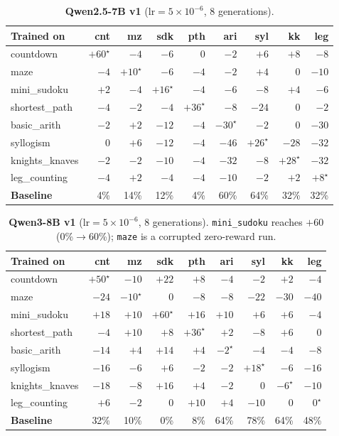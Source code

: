 \documentclass{article}
\begin{document}
\begin{table}[h]
\centering\small
\caption{\textbf{Qwen2.5-7B v1} ($\mathrm{lr}{=}5{\times}10^{-6}$, 8 generations).}
\begin{tabular}{lrrrrrrrr}
\toprule
Trained on & cnt & mz & sdk & pth & ari & syl & kk & leg\\
\midrule
countdown      & $+60^\star$ & $-4$ & $-6$ & $0$ & $-2$ & $+6$ & $+8$ & $-8$\\
maze           & $-4$ & $+10^\star$ & $-6$ & $-4$ & $-2$ & $+4$ & $0$ & $-10$\\
mini\_sudoku   & $+2$ & $-4$ & $+16^\star$ & $-4$ & $-6$ & $-8$ & $+4$ & $-6$\\
shortest\_path & $-4$ & $-2$ & $-4$ & $+36^\star$ & $-8$ & $-24$ & $0$ & $-2$\\
basic\_arith   & $-2$ & $+2$ & $-12$ & $-4$ & $-30^\star$ & $-2$ & $0$ & $-30$\\
syllogism      & $0$ & $+6$ & $-12$ & $-4$ & $-46$ & $+26^\star$ & $-28$ & $-32$\\
knights\_knaves& $-2$ & $-2$ & $-10$ & $-4$ & $-32$ & $-8$ & $+28^\star$ & $-32$\\
leg\_counting  & $-4$ & $+2$ & $-4$ & $-4$ & $-10$ & $-2$ & $+2$ & $+8^\star$\\
\midrule
\textbf{Baseline} & 4\% & 14\% & 12\% & 4\% & 60\% & 64\% & 32\% & 32\%\\
\bottomrule
\end{tabular}
\end{table}

\begin{table}[h]
\centering\small
\caption{\textbf{Qwen3-8B v1} ($\mathrm{lr}{=}5{\times}10^{-6}$, 8 generations). \texttt{mini\_sudoku}
reaches $+60$ (0\%$\rightarrow$60\%); \texttt{maze} is a corrupted zero-reward run.}
\begin{tabular}{lrrrrrrrr}
\toprule
Trained on & cnt & mz & sdk & pth & ari & syl & kk & leg\\
\midrule
countdown      & $+50^\star$ & $-10$ & $+22$ & $+8$ & $-4$ & $-2$ & $+2$ & $-4$\\
maze           & $-24$ & $-10^\star$ & $0$ & $-8$ & $-8$ & $-22$ & $-30$ & $-40$\\
mini\_sudoku   & $+18$ & $+10$ & $+60^\star$ & $+16$ & $+10$ & $+6$ & $+6$ & $-4$\\
shortest\_path & $-4$ & $+10$ & $+8$ & $+36^\star$ & $+2$ & $-8$ & $+6$ & $0$\\
basic\_arith   & $-14$ & $+4$ & $+14$ & $+4$ & $-2^\star$ & $-4$ & $-4$ & $-8$\\
syllogism      & $-16$ & $-6$ & $+6$ & $-2$ & $-2$ & $+18^\star$ & $-6$ & $-16$\\
knights\_knaves& $-18$ & $-8$ & $+16$ & $+4$ & $-2$ & $0$ & $-6^\star$ & $-10$\\
leg\_counting  & $+6$ & $-2$ & $0$ & $+10$ & $+4$ & $-10$ & $0$ & $0^\star$\\
\midrule
\textbf{Baseline} & 32\% & 10\% & 0\% & 8\% & 64\% & 78\% & 64\% & 48\%\\
\bottomrule
\end{tabular}
\end{table}
\end{document}
